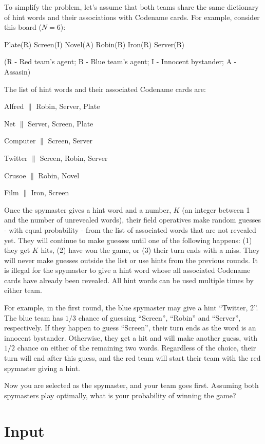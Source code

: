 \documentclass[11pt,letterpaper]{article}
\begin{document}
To simplify the problem, let's assume that both teams share the same dictionary of hint words and their associations with Codename cards. For example, consider this board ($N = 6$):

Plate(R) Screen(I) Novel(A) Robin(B) Iron(R) Server(B)

(R - Red team's agent; B - Blue team's agent; I - Innocent bystander; A - Assasin)

The list of hint words and their associated Codename cards are:

Alfred   $\|$ Robin, Server, Plate

Net      $\|$ Server, Screen, Plate

Computer $\|$ Screen, Server

Twitter  $\|$ Screen, Robin, Server

Crusoe   $\|$ Robin, Novel

Film     $\|$ Iron, Screen

Once the spymaster gives a hint word and a number, $K$ (an integer between 1 and the number of unrevealed words), their field operatives make random guesses - with equal probability - from the list of associated words that are not revealed yet. They will continue to make guesses until one of the following happens: (1) they get $K$ hits, (2) have won the game, or (3) their turn ends with a miss. They will never make guesses outside the list or use hints from the previous rounds. It is illegal for the spymaster to give a hint word whose all associated Codename cards have already been revealed. All hint words can be used multiple times by either team.

For example, in the first round, the blue spymaster may give a hint ``Twitter, 2''. The blue team has $1/3$ chance of guessing ``Screen'', ``Robin'' and ``Server'', respectively. If they happen to guess ``Screen'', their turn ends as the word is an innocent bystander. Otherwise, they get a hit and will make another guess, with $1/2$ chance on either of the remaining two words. Regardless of the choice, their turn will end after this guess, and the red team will start their team with the red spymaster giving a hint.

Now you are selected as the spymaster, and your team goes first. Assuming both spymasters play optimally, what is your probability of winning the game?

\section*{Input}
\end{document}
